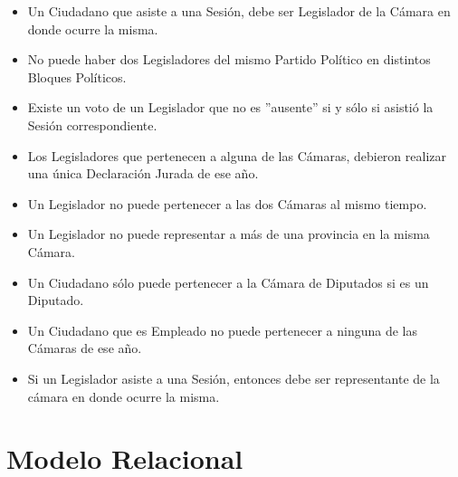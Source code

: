 \begin{itemize}
	\item Un Ciudadano que asiste a una Sesión, debe ser Legislador de la Cámara en donde ocurre la misma.
	\item No puede haber dos Legisladores del mismo Partido Político en distintos Bloques Políticos. 
	\item Existe un voto de un Legislador que no es ''ausente'' si y sólo si asistió la Sesión correspondiente.
	\item Los Legisladores que pertenecen a alguna de las Cámaras, debieron realizar una única Declaración Jurada de ese año.
	\item Un Legislador no puede pertenecer a las dos Cámaras al mismo tiempo. 
	\item Un Legislador no puede representar a más de una provincia en la misma Cámara. 
	\item Un Ciudadano sólo puede pertenecer a la Cámara de Diputados si es un Diputado.
	\item Un Ciudadano que es Empleado no puede pertenecer a ninguna de las Cámaras de ese año.	
	\item Si un Legislador asiste a una Sesión, entonces debe ser representante de la cámara en donde ocurre la misma.

\end{itemize}

\newpage

\section{Modelo Relacional}

